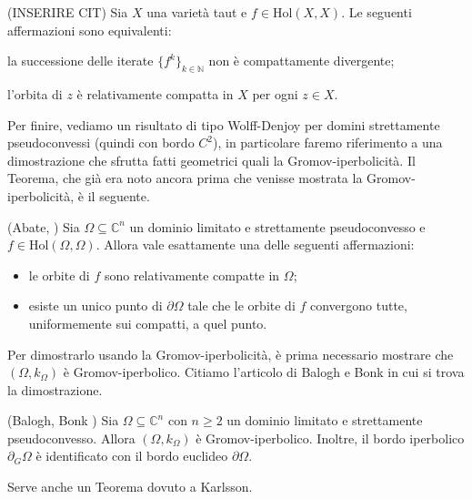 \begin{thm}
    (INSERIRE CIT) Sia $X$ una varietà taut e $f \in \text{Hol}(X,X)$. Le seguenti affermazioni sono equivalenti:
    \begin{nlist}
        \item la successione delle iterate $\{f^k\}_{k \in \mathbb{N}}$ non è compattamente divergente;
        \item l'orbita di $z$ è relativamente compatta in $X$ per ogni $z \in X$.
    \end{nlist}
\end{thm}

Per finire, vediamo un risultato di tipo Wolff-Denjoy per domini strettamente pseudoconvessi (quindi con bordo $C^2$), in particolare faremo riferimento a una dimostrazione che sfrutta fatti geometrici quali la Gromov-iperbolicità. Il Teorema, che già era noto ancora prima che venisse mostrata la Gromov-iperbolicità, è il seguente.

\begin{thm} \label{abate_wd}
    (Abate, \cite[Theorem 0.5]{A}) Sia $\Omega \subseteq \mathbb{C}^n$ un dominio limitato e strettamente pseudoconvesso e $f \in \text{Hol}(\Omega,\Omega)$. Allora vale esattamente una delle seguenti affermazioni:
    \begin{itemize}
        \item le orbite di $f$ sono relativamente compatte in $\Omega$;
        \item esiste un unico punto di $\partial\Omega$ tale che le orbite di $f$ convergono tutte, uniformemente sui compatti, a quel punto.
    \end{itemize}
\end{thm}

Per dimostrarlo usando la Gromov-iperbolicità, è prima necessario mostrare che $(\Omega,k_{\Omega})$ è Gromov-iperbolico. Citiamo l'articolo di Balogh e Bonk in cui si trova la dimostrazione.

\begin{thm} \label{balogh_bonk}
    (Balogh, Bonk \cite[Theorem 1.4]{BB}) Sia $\Omega \subseteq \mathbb{C}^n$ con $n \ge 2$ un dominio limitato e strettamente pseudoconvesso. Allora $(\Omega,k_{\Omega})$ è Gromov-iperbolico. Inoltre, il bordo iperbolico $\partial_G\Omega$ è identificato con il bordo euclideo $\partial\Omega$.
\end{thm}

Serve anche un Teorema dovuto a Karlsson.

